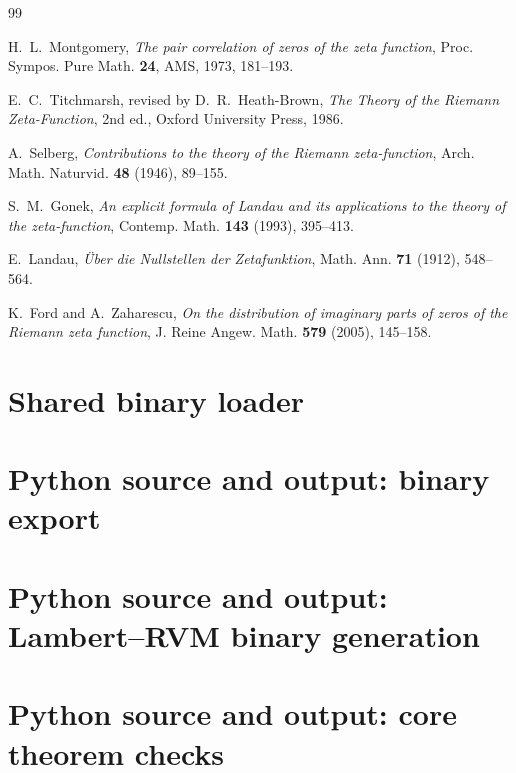 \documentclass[11pt]{amsart}
\theoremstyle{definition}
\theoremstyle{remark}
\begin{document}
\begin{thebibliography}{99}

H.~L.~Montgomery,
\emph{The pair correlation of zeros of the zeta function},
Proc. Sympos. Pure Math. \textbf{24}, AMS, 1973, 181--193.

E.~C.~Titchmarsh, revised by D.~R.~Heath-Brown,
\emph{The Theory of the Riemann Zeta-Function}, 2nd ed.,
Oxford University Press, 1986.

A.~Selberg,
\emph{Contributions to the theory of the Riemann zeta-function},
Arch. Math. Naturvid. \textbf{48} (1946), 89--155.

S.~M.~Gonek,
\emph{An explicit formula of Landau and its applications to the theory of the
zeta-function},
Contemp. Math. \textbf{143} (1993), 395--413.

E.~Landau,
\emph{Über die Nullstellen der Zetafunktion},
Math. Ann. \textbf{71} (1912), 548--564.

K.~Ford and A.~Zaharescu,
\emph{On the distribution of imaginary parts of zeros of the Riemann zeta
function},
J. Reine Angew. Math. \textbf{579} (2005), 145--158.

\end{thebibliography}

\appendix

\section{Shared binary loader}


\section{Python source and output: binary export}



\section{Python source and output: Lambert--RVM binary generation}



\section{Python source and output: core theorem checks}


\end{document}
